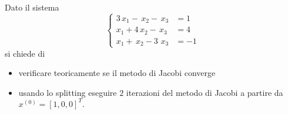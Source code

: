 Dato il sistema
\[ \left \{
\begin{array}{ll}
3\,  x_1-\, x_2-\,x_3 &=1\\
x_1+4\, x_2 -\, x_3&=4 \\
x_1+\,x_2 - 3\, \,x_3&=-1
\end{array}
\right.
\]
si chiede di
\begin{itemize}
\item verificare teoricamente se il metodo di Jacobi converge
\item usando lo splitting eseguire $2$ iterazioni del metodo di Jacobi a partire da $x^{(0)}=[1, 0, 0]^T.$
\end{itemize} 